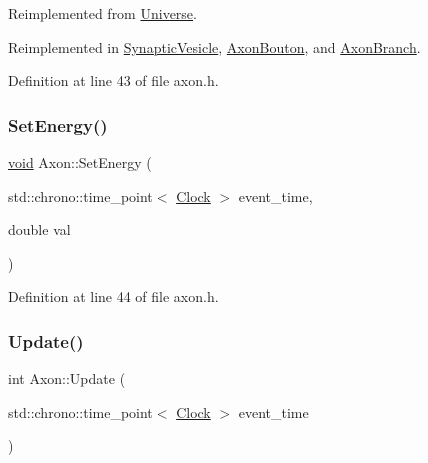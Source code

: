 Reimplemented from \mbox{\hyperlink{class_universe_aa22202ae740eb1355529afcb13285e91}{Universe}}.



Reimplemented in \mbox{\hyperlink{class_synaptic_vesicle_a7fd7cfce5eccb904206d968866f85220}{Synaptic\+Vesicle}}, \mbox{\hyperlink{class_axon_bouton_afe285478d414f2815afb98abe7b92898}{Axon\+Bouton}}, and \mbox{\hyperlink{class_axon_branch_a96ba30b18627563d637d4e02fac943be}{Axon\+Branch}}.



Definition at line 43 of file axon.\+h.

\mbox{\label{class_axon_af5108f451de97deb56138e8e81ced359}} 
\subsubsection{\texorpdfstring{Set\+Energy()}{SetEnergy()}}
{\footnotesize\ttfamily \mbox{\hyperlink{glad_8h_a950fc91edb4504f62f1c577bf4727c29}{void}} Axon\+::\+Set\+Energy (\begin{DoxyParamCaption}\item[{std\+::chrono\+::time\+\_\+point$<$ \mbox{\hyperlink{universe_8h_a0ef8d951d1ca5ab3cfaf7ab4c7a6fd80}{Clock}} $>$}]{event\+\_\+time,  }\item[{double}]{val }\end{DoxyParamCaption})\hspace{0.3cm}{\ttfamily [inline]}}



Definition at line 44 of file axon.\+h.

\mbox{\label{class_axon_a472ee760a1727072afaff0035d1eedd9}} 
\subsubsection{\texorpdfstring{Update()}{Update()}}
{\footnotesize\ttfamily int Axon\+::\+Update (\begin{DoxyParamCaption}\item[{std\+::chrono\+::time\+\_\+point$<$ \mbox{\hyperlink{universe_8h_a0ef8d951d1ca5ab3cfaf7ab4c7a6fd80}{Clock}} $>$}]{event\+\_\+time }\end{DoxyParamCaption})}



